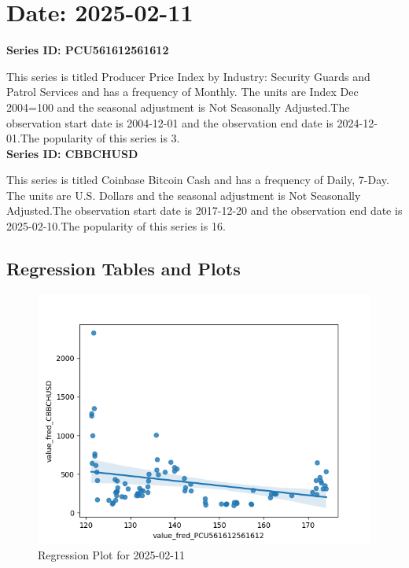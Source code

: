 \section{Date: 2025-02-11}
\noindent \textbf{Series ID: PCU561612561612} 

\noindent This series is titled Producer Price Index by Industry: Security Guards and Patrol Services and has a frequency of Monthly. The units are Index Dec 2004=100 and the seasonal adjustment is Not Seasonally Adjusted.The observation start date is 2004-12-01 and the observation end date is 2024-12-01.The popularity of this series is 3. \\ 

\noindent \textbf{Series ID: CBBCHUSD} 

\noindent This series is titled Coinbase Bitcoin Cash and has a frequency of Daily, 7-Day. The units are U.S. Dollars and the seasonal adjustment is Not Seasonally Adjusted.The observation start date is 2017-12-20 and the observation end date is 2025-02-10.The popularity of this series is 16. \\ 

\subsection{Regression Tables and Plots}


\begin{figure}
\centering
\includegraphics[scale = 0.9]{plots/plot_2025-02-11.png}
\caption{Regression Plot for 2025-02-11}
\end{figure}
\newpage
